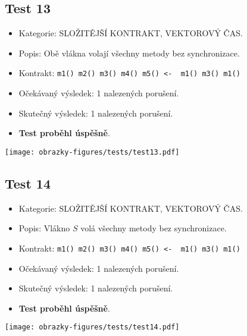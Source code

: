 \subsection*{Test 13}
\begin{itemize}
\item Kategorie: SLOŽITĚJŠÍ KONTRAKT, VEKTOROVÝ ČAS.
\item Popis: Obě vlákna volají všechny metody bez synchronizace.
\item Kontrakt: \texttt{m1() m2() m3() m4() m5() <- { m1() m3() m1()}}
\item Očekávaný výsledek: 1 nalezených porušení.
\item Skutečný výsledek: 1 nalezených porušení.

\item \textbf{Test proběhl úspěšně}.
\end{itemize}
\begin{center}
    \centering
    \texttt{[image: obrazky-figures/tests/test13.pdf]}
    \label{test13}
\end{center}

\subsection*{Test 14}
\begin{itemize}
\item Kategorie: SLOŽITĚJŠÍ KONTRAKT, VEKTOROVÝ ČAS.
\item Popis: Vlákno $S$ volá všechny metody bez synchronizace.
\item Kontrakt: \texttt{m1() m2() m3() m4() m5() <- { m1() m3() m1()}}
\item Očekávaný výsledek: 1 nalezených porušení.
\item Skutečný výsledek: 1 nalezených porušení.

\item \textbf{Test proběhl úspěšně}.
\end{itemize}
\begin{center}
    \centering
    \texttt{[image: obrazky-figures/tests/test14.pdf]}
    \label{test14}
\end{center}


